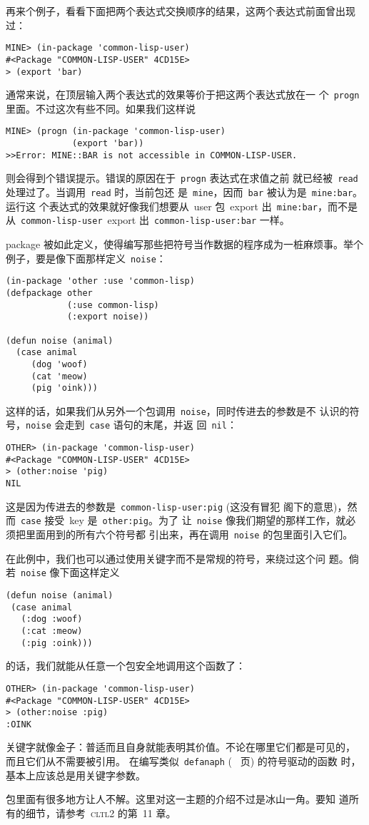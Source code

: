 再来个例子，看看下面把两个表达式交换顺序的结果，这两个表达式前面曾出现过：
\begin{verbatim}
MINE> (in-package 'common-lisp-user)
#<Package "COMMON-LISP-USER" 4CD15E>
> (export 'bar)
\end{verbatim}
通常来说，在顶层输入两个表达式的效果等价于把这两个表达式放在一
个~\texttt{progn} 里面。不过这次有些不同。如果我们这样说
\begin{verbatim}
MINE> (progn (in-package 'common-lisp-user)
             (export 'bar))
>>Error: MINE::BAR is not accessible in COMMON-LISP-USER.
\end{verbatim}
则会得到个错误提示。错误的原因在于~\texttt{progn} 表达式在求值之前
就已经被~\texttt{read} 处理过了。当调用~\texttt{read} 时，当前包还
是~\texttt{mine}，因而~\texttt{bar} 被认为是~\texttt{mine:bar}。 运行这
个表达式的效果就好像我们想要从~user 包~export 出~\texttt{mine:bar}，而不是
从~\verb|common-lisp-user|~export 出~\texttt{common-lisp-user:bar} 一样。

package 被如此定义，使得编写那些把符号当作数据的程序成为一桩麻烦事。举个例子，要是像下面那样定义~\texttt{noise}：
\begin{verbatim}
(in-package 'other :use 'common-lisp)
(defpackage other
            (:use common-lisp)
            (:export noise))

(defun noise (animal)
  (case animal
     (dog 'woof)
     (cat 'meow)
     (pig 'oink)))
\end{verbatim}
这样的话，如果我们从另外一个包调用~\texttt{noise}，同时传进去的参数是不
认识的符号，\texttt{noise} 会走到~\texttt{case} 语句的末尾，并返
回~\texttt{nil}：
\begin{verbatim}
OTHER> (in-package 'common-lisp-user)
#<Package "COMMON-LISP-USER" 4CD15E>
> (other:noise 'pig)
NIL
\end{verbatim}
这是因为传进去的参数是~\texttt{common-lisp-user:pig} (这没有冒犯
阁下的意思)，然而~\texttt{case} 接受~key 是~\texttt{other:pig}。为了
让~\texttt{noise} 像我们期望的那样工作，就必须把里面用到的所有六个符号都
引出来，再在调用~\texttt{noise} 的包里面引入它们。

在此例中，我们也可以通过使用关键字而不是常规的符号，来绕过这个问
题。倘若~\texttt{noise} 像下面这样定义
\begin{verbatim}
(defun noise (animal)
 (case animal
   (:dog :woof)
   (:cat :meow)
   (:pig :oink)))
\end{verbatim}
的话，我们就能从任意一个包安全地调用这个函数了：
\begin{verbatim}
OTHER> (in-package 'common-lisp-user)
#<Package "COMMON-LISP-USER" 4CD15E>
> (other:noise :pig)
:OINK
\end{verbatim}

关键字就像金子：普适而且自身就能表明其价值。不论在哪里它们都是可见的，
而且它们从不需要被引用。
在编写类似~\texttt{defanaph} (~\pageref{macro:defanaph} 页) 的符号驱动的函数
时，基本上应该总是用关键字参数。

包里面有很多地方让人不解。这里对这一主题的介绍不过是冰山一角。要知
道所有的细节，请参考~\textsc{cltl}2 的第~11 章。

